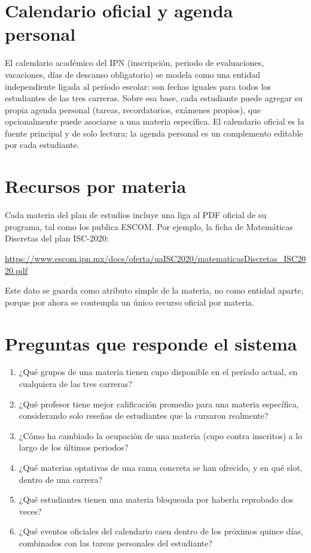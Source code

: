 \documentclass[11pt,letterpaper]{article}
\begin{document}
\section{Calendario oficial y agenda personal}

El calendario académico del IPN (inscripción, periodo de evaluaciones, vacaciones, días de descanso obligatorio) se modela como una entidad independiente ligada al período escolar: son fechas iguales para todos los estudiantes de las tres carreras. Sobre esa base, cada estudiante puede agregar su propia agenda personal (tareas, recordatorios, exámenes propios), que opcionalmente puede asociarse a una materia específica. El calendario oficial es la fuente principal y de solo lectura; la agenda personal es un complemento editable por cada estudiante.

\section{Recursos por materia}

Cada materia del plan de estudios incluye una liga al PDF oficial de su programa, tal como los publica ESCOM. Por ejemplo, la ficha de Matemáticas Discretas del plan ISC-2020:

\begin{center}
\small\url{https://www.escom.ipn.mx/docs/oferta/uaISC2020/matematicasDiscretas_ISC2020.pdf}
\end{center}

Este dato se guarda como atributo simple de la materia, no como entidad aparte, porque por ahora se contempla un único recurso oficial por materia.

\section{Preguntas que responde el sistema}

\begin{enumerate}[nosep]
  \item ¿Qué grupos de una materia tienen cupo disponible en el período actual, en cualquiera de las tres carreras?
  \item ¿Qué profesor tiene mejor calificación promedio para una materia específica, considerando solo reseñas de estudiantes que la cursaron realmente?
  \item ¿Cómo ha cambiado la ocupación de una materia (cupo contra inscritos) a lo largo de los últimos periodos?
  \item ¿Qué materias optativas de una rama concreta se han ofrecido, y en qué slot, dentro de una carrera?
  \item ¿Qué estudiantes tienen una materia bloqueada por haberla reprobado dos veces?
  \item ¿Qué eventos oficiales del calendario caen dentro de los próximos quince días, combinados con las tareas personales del estudiante?
\end{enumerate}
\end{document}
